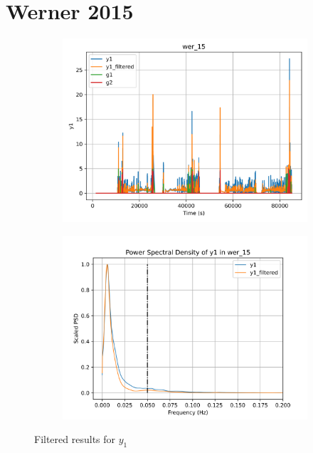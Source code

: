 \section{Werner 2015}

\begin{figure}[H]

\begin{minipage}{0.49\textwidth}
        \begin{figure}[H]
                \centering
                \includegraphics[width = \textwidth]{./figs/trk_filt/wer_15/y1.png}
        \end{figure}
\end{minipage}
\begin{minipage}{0.49\textwidth}
        \begin{figure}[H]
                \centering
                \includegraphics[width = \textwidth]{./figs/trk_filt/wer_15/y1_psd.png}
        \end{figure}
\end{minipage}
\caption{Filtered results for $y_1$}

\end{figure}


